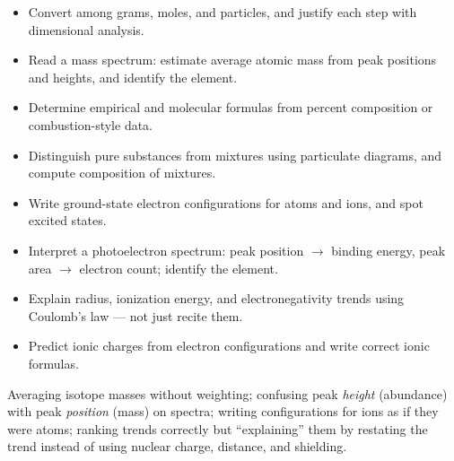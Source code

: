 \documentclass{apchem-worksheet}
\begin{document}
\begin{itemize}[leftmargin=*,itemsep=0.15em]
  \item Convert among grams, moles, and particles, and justify each step
        with dimensional analysis. 
  \item Read a mass spectrum: estimate average atomic mass from peak
        positions and heights, and identify the element. 
  \item Determine empirical and molecular formulas from percent composition
        or combustion-style data. 
  \item Distinguish pure substances from mixtures using particulate
        diagrams, and compute composition of mixtures. 
  \item Write ground-state electron configurations for atoms and ions, and
        spot excited states. 
  \item Interpret a photoelectron spectrum: peak position $\to$ binding
        energy, peak area $\to$ electron count; identify the element. 
  \item Explain radius, ionization energy, and electronegativity trends
        using Coulomb's law --- not just recite them. 
  \item Predict ionic charges from electron configurations and write
        correct ionic formulas. 
\end{itemize}

\begin{apctrap}
Averaging isotope masses without weighting; confusing peak \emph{height}
(abundance) with peak \emph{position} (mass) on spectra; writing configurations
for ions as if they were atoms; ranking trends correctly but ``explaining''
them by restating the trend instead of using nuclear charge, distance, and
shielding.
\end{apctrap}
\end{document}
